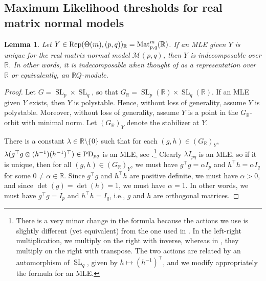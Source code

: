 \documentclass[11pt]{amsart}
\newtheorem{lemma}[theorem]{Lemma}
\theoremstyle{definition}
\newcommand{\R}{{\mathbb R}}
\newcommand{\Rep}{{\rm Rep}}
\newcommand{\PD} {{\rm PD}}
\newcommand{\Mat}{\operatorname{Mat}}
\newcommand{\SL}{\operatorname{SL}}
\begin{document}
\subsection{Maximum Likelihood thresholds for real matrix normal models}


\begin{lemma} \label{uni-MLE-indec}
Let $Y \in \Rep(\Theta(m),(p,q))_\R = \Mat_{p,q}^m(\R)$. If an MLE given $Y$ is unique for the real matrix normal model $\mathcal{M}(p,q)$, then $Y$ is indecomposable over $\R$. In other words, it is indecomposable when thought of as a representation over $\R$ or equivalently, an $\R Q$-module.
\end{lemma}

\begin{proof}
Let $G = \SL_p \times \SL_q$, so that $G_\R = \SL_p(\R) \times \SL_q(\R)$. If an MLE given $Y$ exists, then $Y$ is polystable. Hence, without loss of generality, assume $Y$ is polystable. Moreover, without loss of generality, assume $Y$ is a point in the $G_\R$-orbit with minimal norm. Let $(G_\R)_Y$ denote the stabilizer at $Y$. 

There is a constant $\lambda \in \R\setminus \{0\}$ such that for each $(g,h) \in (G_\R)_Y$, $\lambda(g^\top g \otimes (h^{-1}) (h^{-1})^\top) \in \PD_{pq}$ is an MLE, see \cite[Proposition~5.2, Remark~5.5]{AKRS}.\footnote{There is a very minor change in the formula because the actions we use is slightly different (yet equivalent) from the one used in \cite{AKRS}. In the left-right multiplication, we multiply on the right with inverse, whereas in \cite{AKRS}, they multiply on the right with transpose. The two actions are related by an automorphism of $\SL_q$, given by $h \mapsto (h^{-1})^{\top}$, and we modify appropriately the formula for an MLE.} Clearly $\lambda I_{pq}$ is an MLE, so if it is unique, then for all $(g,h) \in (G_\R)_Y$, we must have $g^\top g = \alpha I_p$ and $h^\top h = \alpha I_q$ for some $0 \neq \alpha \in \R$. Since $g^\top g$ and $h^\top h$ are positive definite, we must have $\alpha > 0$, and since $\det(g) = \det(h) = 1$, we must have $\alpha = 1$. In other words, we must have $g^\top g = I_p$ and $h^\top h = I_q$, i.e., $g$ and $h$ are orthogonal matrices.




\end{proof}
\end{document}
